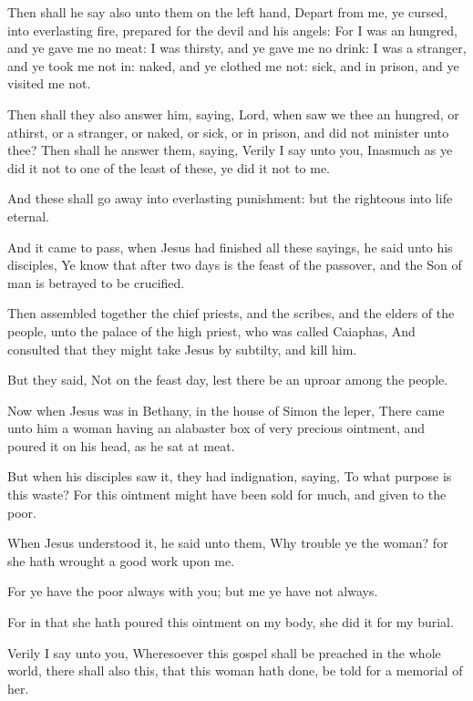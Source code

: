 \Verse Then shall he say also unto them on the left hand, Depart from me, ye cursed, into everlasting fire, prepared for the devil and his angels: \Verse For I was an hungred, and ye gave me no meat: I was thirsty, and ye gave me no drink: \Verse I was a stranger, and ye took me not in: naked, and ye clothed me not: sick, and in prison, and ye visited me not.

\Verse Then shall they also answer him, saying, Lord, when saw we thee an hungred, or athirst, or a stranger, or naked, or sick, or in prison, and did not minister unto thee?  \Verse Then shall he answer them, saying, Verily I say unto you, Inasmuch as ye did it not to one of the least of these, ye did it not to me.

\Verse And these shall go away into everlasting punishment: but the righteous into life eternal.


\Chapter
\Verse And it came to pass, when Jesus had finished all these sayings, he said unto his disciples, \Verse Ye know that after two days is the feast of the passover, and the Son of man is betrayed to be crucified.

\Verse Then assembled together the chief priests, and the scribes, and the elders of the people, unto the palace of the high priest, who was called Caiaphas, \Verse And consulted that they might take Jesus by subtilty, and kill him.

\Verse But they said, Not on the feast day, lest there be an uproar among the people.

\Verse Now when Jesus was in Bethany, in the house of Simon the leper, \Verse There came unto him a woman having an alabaster box of very precious ointment, and poured it on his head, as he sat at meat.

\Verse But when his disciples saw it, they had indignation, saying, To what purpose is this waste?  \Verse For this ointment might have been sold for much, and given to the poor.

\Verse When Jesus understood it, he said unto them, Why trouble ye the woman? for she hath wrought a good work upon me.

\Verse For ye have the poor always with you; but me ye have not always.

\Verse For in that she hath poured this ointment on my body, she did it for my burial.

\Verse Verily I say unto you, Wheresoever this gospel shall be preached in the whole world, there shall also this, that this woman hath done, be told for a memorial of her.

